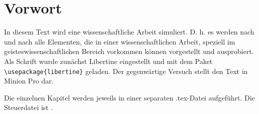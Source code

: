 \chapter*{Vorwort}
In diesem Text wird eine wissenschaftliche Arbeit simuliert. D. h. es werden nach und nach alle Elementen, die in einer wissenschaftlichen Arbeit, speziell im geisteswissenschaftlichen Bereich vorkommen können vorgestellt und ausprobiert. Als Schrift wurde zunächst Libertine eingestellt und mit dem Paket \verb*+\usepackage{libertine}+ geladen. Der gegenwärtige Versuch stellt den Text in Minion Pro dar.

Die einzelnen Kapitel werden jeweils in einer separaten .tex-Datei aufgeführt. Die Steuerdatei ist . 